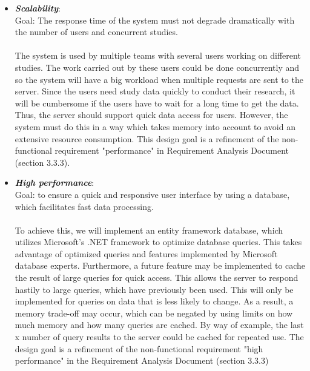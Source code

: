 \begin{itemize}
\item \textit{\bf{Scalability}}:
\\
Goal: The response time of the system must not degrade dramatically with the number of users and concurrent studies. 
\\\\
The system is used by multiple teams with several users working on different studies. The work carried out by these users could be done concurrently and so the system will have a big workload when multiple requests are sent to the server. Since the users need study data quickly to conduct their research, it will be cumbersome if the users have to wait for a long time to get the data. Thus, the server should support quick data access for users. However, the system must do this in a way which takes memory into account to avoid an extensive resource consumption. This design goal is a refinement of the non-functional requirement "performance" in Requirement Analysis Document (section 3.3.3). 

\item \textit{\bf{High performance}}: 
\\
Goal: to ensure a quick and responsive user interface by using a database, which facilitates fast data processing.  
\\\\
To achieve this, we will implement an entity framework database, which utilizes Microsoft's .NET framework to optimize database queries. This takes advantage of optimized queries and features implemented by Microsoft database experts. Furthermore, a future feature may be implemented to cache the result of large queries for quick access. This allows the server to respond hastily to large queries, which have previously been used. This will only be implemented for queries on data that is less likely to change. As a result, a memory trade-off may occur, which can be negated by using limits on how much memory and how many queries are cached. By way of example, the last x number of query results to the server could be cached for repeated use. The design goal is a refinement of the non-functional requirement "high performance" in the Requirement Analysis Document (section 3.3.3)

\end{itemize}